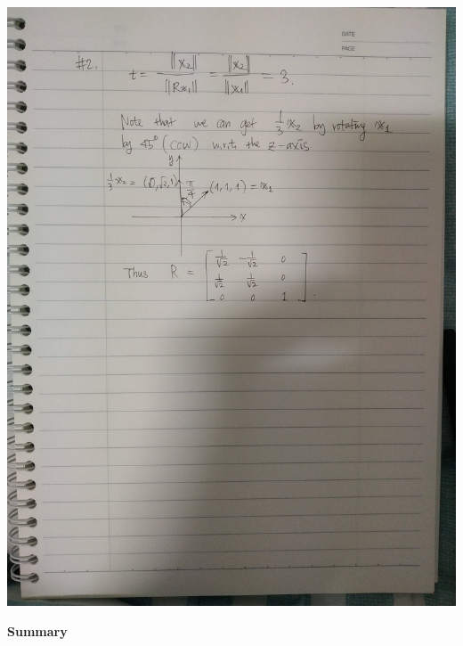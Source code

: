 \documentclass{homework}
\begin{document}
\includegraphics[width=\textwidth,origin=c]{prob2.jpg}
\newpage

\vspace*{-0.5cm}
{\Large\bf Summary}
\end{document}
